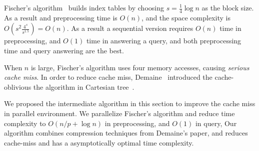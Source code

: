 
Fischer's algorithm~\cite{Fischer2006TheoreticalAP} builds index
tables by choosing $s = \frac{1}{4} \log n$ as the block size.  As a
result and preprocessing time is $O(n)$, and the space complexity is
$O(s^2 \frac{4^s}{s^{1.5}}) = O(n)$.  As a result a sequential version
requires $O(n)$ time in preprocessing, and $O(1)$ time in answering a
query, and both preprocessing time and query answering are the best.


When $n$ is large, Fischer's algorithm uses four memory accesses,
causing {\em serious cache miss}.  In order to reduce cache miss,
Demaine~\cite{Demaine2009OnCT} introduced the cache-oblivious the
algorithm in Cartesian tree~\cite{Vuillemin1980AUL}.







We proposed the intermediate algorithm in this section to improve the
cache miss in parallel environment.  We parallelize Fischer's
algorithm and reduce time complexity to $O(n / p + \log n)$ in
preprocessing, and $O(1)$ in query, Our algorithm combines compression
techniques from Demaine's paper, and reduces cache-miss and has a
asymptotically optimal time complexity.

